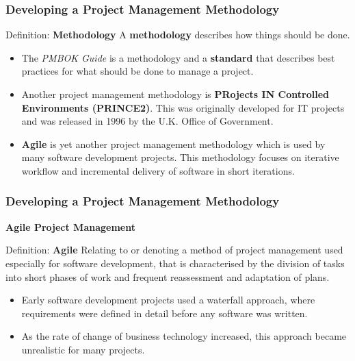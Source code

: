 \documentclass[aspectratio=169]{beamer}
\begin{document}
\begin{frame}
\frametitle{Developing a Project Management Methodology}
\begin{block}{Definition: \textbf{Methodology}}
A \textbf{methodology} describes how things should be done.
\end{block}
\begin{itemize}
\item The \textit{PMBOK Guide} is a methodology  and a \textbf{standard} that describes best practices for what should be done to manage a project.
\item Another project management methodology is \textbf{PRojects IN Controlled Environments (PRINCE2)}. This was originally developed for IT projects and was released in 1996 by the U.K. Office of Government.
\item \textbf{Agile} is yet another project management methodology which is used by many software development projects. This methodology focuses on iterative workflow and incremental delivery of software in short iterations.
\end{itemize}
\end{frame}

\begin{frame}
\frametitle{Developing a Project Management Methodology}
\textbf{Agile Project Management}
\vspace{0.5cm}
\begin{block}{Definition: \textbf{Agile}}
Relating to or denoting a method of project management used especially for software development, that is characterised by the division of tasks into short phases of work and frequent reassessment and adaptation of plans.
\end{block}
\begin{itemize}
\item Early software development projects used a waterfall approach, where requirements were defined in detail before any software was written.
\item As the rate of change of business technology increased, this approach became unrealistic for many projects.
\end{itemize}
\end{frame}
\end{document}
